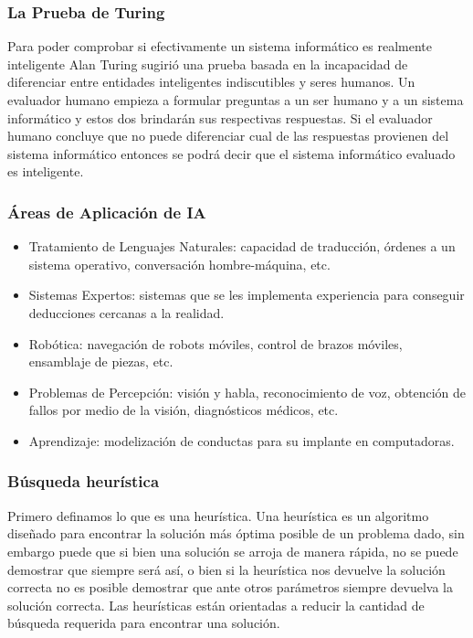 \documentclass[a4paper]{article}
\begin{document}
\subsubsection*{La Prueba de Turing}
Para poder comprobar si efectivamente un sistema informático es realmente inteligente Alan Turing sugirió una prueba basada en la incapacidad de diferenciar entre entidades inteligentes indiscutibles y seres humanos. Un evaluador humano empieza a formular preguntas a un ser humano y a un sistema informático y estos dos brindarán sus respectivas respuestas. Si el evaluador humano concluye que no puede diferenciar cual de las respuestas provienen del sistema informático entonces se podrá decir que el sistema informático evaluado es inteligente.

\subsubsection*{\'Areas de Aplicaci\'on de IA}
\begin{itemize}
\item Tratamiento de Lenguajes Naturales: capacidad de traducción, órdenes a un sistema operativo, conversación hombre-máquina, etc.
\item Sistemas Expertos: sistemas que se les implementa experiencia para conseguir deducciones cercanas a la realidad.
\item Robótica: navegación de robots móviles, control de brazos móviles, ensamblaje de piezas, etc.
\item Problemas de Percepción: visión y habla, reconocimiento de voz, obtención de fallos por medio de la visión, diagnósticos médicos, etc.
\item Aprendizaje: modelización de conductas para su implante en computadoras.
\end{itemize}

\subsubsection*{B\'usqueda heur\'istica}
Primero definamos lo que es una heurística. Una heurística es un algoritmo diseñado para encontrar la solución más óptima posible de un problema dado, sin embargo puede que si bien una solución se arroja de manera rápida, no se puede demostrar que siempre será así, o bien si la heurística nos devuelve la solución correcta no es posible demostrar que ante otros parámetros siempre devuelva la solución correcta. Las heurísticas están orientadas a reducir la cantidad de búsqueda requerida para encontrar una solución.
\end{document}
